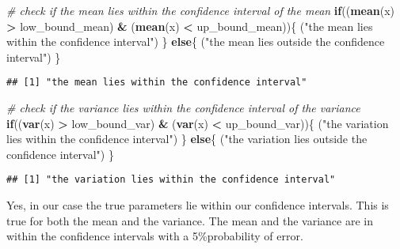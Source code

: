 \documentclass[
]{article}
\newenvironment{Shaded}{\begin{snugshade}}{\end{snugshade}}
\newcommand{\CommentTok}[1]{\textcolor[rgb]{0.56,0.35,0.01}{\textit{#1}}}
\newcommand{\ControlFlowTok}[1]{\textcolor[rgb]{0.13,0.29,0.53}{\textbf{#1}}}
\newcommand{\KeywordTok}[1]{\textcolor[rgb]{0.13,0.29,0.53}{\textbf{#1}}}
\newcommand{\NormalTok}[1]{#1}
\newcommand{\OperatorTok}[1]{\textcolor[rgb]{0.81,0.36,0.00}{\textbf{#1}}}
\newcommand{\StringTok}[1]{\textcolor[rgb]{0.31,0.60,0.02}{#1}}
\begin{document}
\begin{Shaded}
\begin{Highlighting}[]
\CommentTok{# check if the mean lies within the confidence interval of the mean}
\ControlFlowTok{if}\NormalTok{((}\KeywordTok{mean}\NormalTok{(x) }\OperatorTok{>}\StringTok{ }\NormalTok{low_bound_mean) }\OperatorTok{&}\StringTok{ }\NormalTok{(}\KeywordTok{mean}\NormalTok{(x) }\OperatorTok{<}\StringTok{ }\NormalTok{up_bound_mean))\{}
\NormalTok{  (}\StringTok{"the mean lies within the confidence interval"}\NormalTok{)}
\NormalTok{\} }\ControlFlowTok{else}\NormalTok{\{}
\NormalTok{  (}\StringTok{"the mean lies outside the confidence interval"}\NormalTok{)}
\NormalTok{\}}
\end{Highlighting}
\end{Shaded}

\begin{verbatim}
## [1] "the mean lies within the confidence interval"
\end{verbatim}

\begin{Shaded}
\begin{Highlighting}[]
\CommentTok{# check if the variance lies within the confidence interval of the variance}
\ControlFlowTok{if}\NormalTok{((}\KeywordTok{var}\NormalTok{(x) }\OperatorTok{>}\StringTok{ }\NormalTok{low_bound_var) }\OperatorTok{&}\StringTok{ }\NormalTok{(}\KeywordTok{var}\NormalTok{(x) }\OperatorTok{<}\StringTok{ }\NormalTok{up_bound_var))\{}
\NormalTok{  (}\StringTok{"the variation lies within the confidence interval"}\NormalTok{)}
\NormalTok{\} }\ControlFlowTok{else}\NormalTok{\{}
\NormalTok{  (}\StringTok{"the variation lies outside the confidence interval"}\NormalTok{)}
\NormalTok{\}}
\end{Highlighting}
\end{Shaded}

\begin{verbatim}
## [1] "the variation lies within the confidence interval"
\end{verbatim}

Yes, in our case the true parameters lie within our confidence
intervals. This is true for both the mean and the variance. The mean and
the variance are in within the confidence intervals with a
5\%probability of error.
\end{document}

